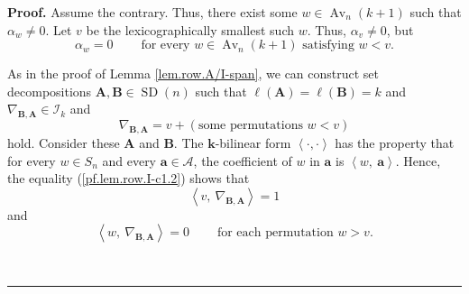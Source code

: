 \documentclass[numbers=enddot,12pt,final,onecolumn,notitlepage]{scrartcl}%
\numberwithin{exer}{subsection}
\theoremstyle{definition}
\newenvironment{proof}[1][Proof]{\noindent\textbf{#1.} }{\ \rule{0.5em}{0.5em}}
\begin{document}
\begin{proof}
Assume the contrary. Thus, there exist some $w\in\operatorname*{Av}%
\nolimits_{n}\left(  k+1\right)  $ such that $\alpha_{w}\neq0$. Let $v$ be the
lexicographically smallest such $w$. Thus, $\alpha_{v}\neq0$, but%
\begin{equation}
\alpha_{w}=0\ \ \ \ \ \ \ \ \ \ \text{for every }w\in\operatorname*{Av}%
\nolimits_{n}\left(  k+1\right)  \text{ satisfying }w<v.
\label{pf.lem.row.I-c1.1}%
\end{equation}


As in the proof of Lemma \ref{lem.row.A/I-span}, we can construct set
decompositions $\mathbf{A},\mathbf{B}\in\operatorname*{SD}\left(  n\right)  $
such that $\ell\left(  \mathbf{A}\right)  =\ell\left(  \mathbf{B}\right)  =k$
and $\nabla_{\mathbf{B},\mathbf{A}}\in\mathcal{I}_{k}$ and%
\begin{equation}
\nabla_{\mathbf{B},\mathbf{A}}=v+\left(  \text{some permutations }w<v\right)
\label{pf.lem.row.I-c1.2}%
\end{equation}
hold. Consider these $\mathbf{A}$ and $\mathbf{B}$. The $\mathbf{k}$-bilinear
form $\left\langle \cdot,\cdot\right\rangle $ has the property that for every
$w\in S_{n}$ and every $\mathbf{a}\in\mathcal{A}$, the coefficient of $w$ in
$\mathbf{a}$ is $\left\langle w,\ \mathbf{a}\right\rangle $. Hence, the
equality (\ref{pf.lem.row.I-c1.2}) shows that%
\begin{equation}
\left\langle v,\ \nabla_{\mathbf{B},\mathbf{A}}\right\rangle =1
\label{pf.lem.row.I-c1.2a}%
\end{equation}
and%
\begin{equation}
\left\langle w,\ \nabla_{\mathbf{B},\mathbf{A}}\right\rangle
=0\ \ \ \ \ \ \ \ \ \ \text{for each permutation }w>v.
\label{pf.lem.row.I-c1.2b}%
\end{equation}



\end{proof}
\end{document}
